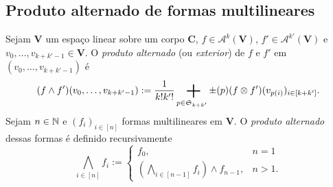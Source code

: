 \subsection{Produto alternado de formas multilineares}

\begin{definition}
Sejam $\bm V$ um espaço linear sobre um corpo $\bm C$, $f \in \mathcal{A}^k(\bm V)$, $f' \in \mathcal{A}^{k'}(\bm V)$ e $v_0,\ldots,v_{k+k'-1} \in \bm V$. O \emph{produto alternado} (ou \emph{exterior}) de $f$ e $f'$ em $(v_0,\ldots,v_{k+k'-1})$ é
	\begin{equation*}
	(f \wedge f')(v_0,\ldots,v_{k+k'-1}) := \frac{1}{k!k'!} \sum_{p \in \sime_{k+k'}} \prd(p) (f \otimes f')(v_{p(i)})_{i \in [k+k']}.
	\end{equation*}
Sejam $n \in \mathbb{N}$ e $(f_i)_{i \in [n]}$ formas multilineares em $\bm V$. O \emph{produto alternado} dessas formas é definido recursivamente
	\begin{equation*}
	\bigwedge_{i \in [n]} f_i := \begin{cases}
		f_0,& n=1 \\
		\left(\displaystyle\bigwedge_{i \in [n-1]} f_i \right) \wedge f_{n-1} ,& n>1.
	\end{cases}
	\end{equation*}
\end{definition}

